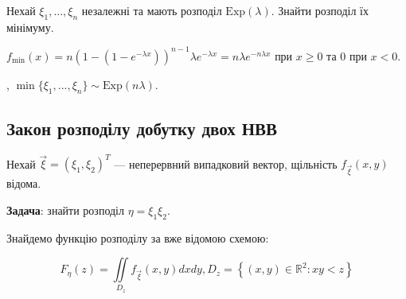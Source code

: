 \begin{example}
    Нехай $\xi_1, ..., \xi_n$ незалежні та мають розподіл $\mathrm{Exp}(\lambda)$. Знайти розподіл їх мінімуму.

    \noindent$f_{\min}(x) = n (1-(1-e^{-\lambda x}))^{n-1} \lambda e^{-\lambda x} = n \lambda e^{-n\lambda x}$ при $x \geq 0$ та $0$ при $x < 0$.
    
    , $\min\{\xi_1, ..., \xi_n\} \sim \mathrm{Exp} (n \lambda)$.
\end{example}

\subsection{Закон розподілу добутку двох НВВ}
Нехай $\vec{\xi} = (\xi_1, \xi_2)^T$ --- неперервний випадковий вектор, щільність
$f_{\vec{\xi}}(x, y)$ відома.

\noindent\textbf{Задача}: знайти розподіл $\eta = \xi_1\xi_2$.

Знайдемо функцію розподілу за вже відомою схемою:

$$F_\eta(z) = \iint\limits_{D_z}f_{\vec{\xi}}(x, y)dx dy, D_z = \left\{(x, y) \in 
\mathbb{R}^2 : xy < z\right\}$$

